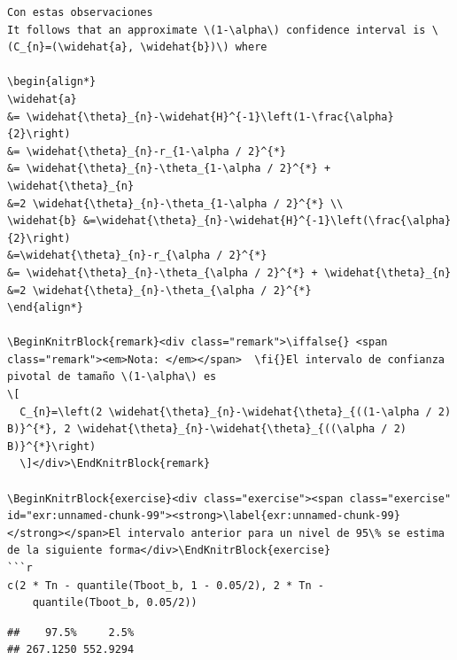 \documentclass[
  12pt,
]{book}
\theoremstyle{definition}
\theoremstyle{definition}
\theoremstyle{definition}
\theoremstyle{remark}
\let\BeginKnitrBlock\begin \let\EndKnitrBlock\end
\begin{document}
\begin{verbatim}
Con estas observaciones
It follows that an approximate \(1-\alpha\) confidence interval is \(C_{n}=(\widehat{a}, \widehat{b})\) where

\begin{align*}
\widehat{a}
&= \widehat{\theta}_{n}-\widehat{H}^{-1}\left(1-\frac{\alpha}{2}\right)
&= \widehat{\theta}_{n}-r_{1-\alpha / 2}^{*}
&= \widehat{\theta}_{n}-\theta_{1-\alpha / 2}^{*} + \widehat{\theta}_{n}
&=2 \widehat{\theta}_{n}-\theta_{1-\alpha / 2}^{*} \\
\widehat{b} &=\widehat{\theta}_{n}-\widehat{H}^{-1}\left(\frac{\alpha}{2}\right)
&=\widehat{\theta}_{n}-r_{\alpha / 2}^{*}
&= \widehat{\theta}_{n}-\theta_{\alpha / 2}^{*} + \widehat{\theta}_{n}
&=2 \widehat{\theta}_{n}-\theta_{\alpha / 2}^{*}
\end{align*}

\BeginKnitrBlock{remark}<div class="remark">\iffalse{} <span class="remark"><em>Nota: </em></span>  \fi{}El intervalo de confianza pivotal de tamaño \(1-\alpha\) es
\[
  C_{n}=\left(2 \widehat{\theta}_{n}-\widehat{\theta}_{((1-\alpha / 2) B)}^{*}, 2 \widehat{\theta}_{n}-\widehat{\theta}_{((\alpha / 2) B)}^{*}\right)
  \]</div>\EndKnitrBlock{remark}

\BeginKnitrBlock{exercise}<div class="exercise"><span class="exercise" id="exr:unnamed-chunk-99"><strong>\label{exr:unnamed-chunk-99} </strong></span>El intervalo anterior para un nivel de 95\% se estima de la siguiente forma</div>\EndKnitrBlock{exercise}
```r
c(2 * Tn - quantile(Tboot_b, 1 - 0.05/2), 2 * Tn - 
    quantile(Tboot_b, 0.05/2))
\end{verbatim}

\begin{verbatim}
##    97.5%     2.5% 
## 267.1250 552.9294
\end{verbatim}
\end{document}

